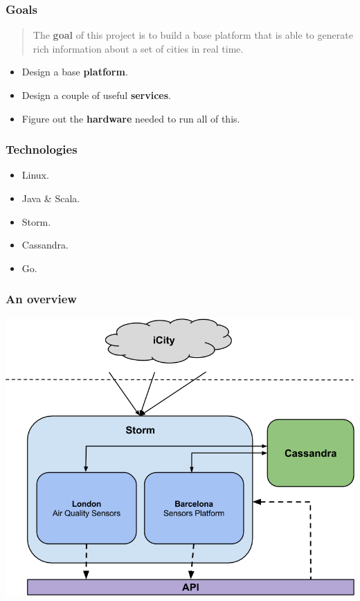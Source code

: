\documentclass[12pt]{beamer}
\begin{document}
\begin{frame}
\vfill
  \frametitle{Goals}
  \begin{quotation}
    The {\bf goal} of this project is to build a base platform that is able to
generate rich information about a set of cities in real time.
  \end{quotation}

  \begin{itemize}
    \item Design a base {\bf platform}.
    \vfill
    \item Design a couple of useful {\bf services}.
    \vfill
    \item Figure out the {\bf hardware} needed to run all of this.
  \end{itemize}
\vfill
\end{frame}

\begin{frame}
\vfill
  \frametitle{Technologies}
  \begin{itemize}
    \item Linux.
    \vfill
    \item Java \& Scala.
    \vfill
    \item Storm.
    \vfill
    \item Cassandra.
    \vfill
    \item Go.
    \vfill
  \end{itemize}
\vfill
\end{frame}

\begin{frame}
\vfill
  \frametitle{An overview}
  \begin{center}
    \includegraphics[scale=0.4]{images/arch.png}
  \end{center}
\vfill
\end{frame}
\end{document}
